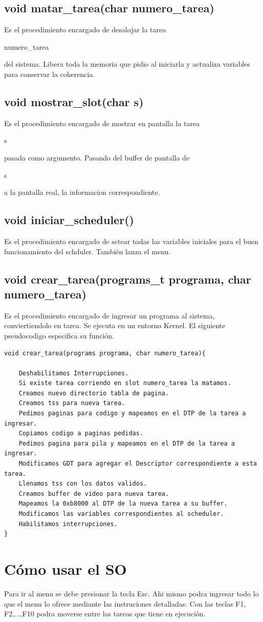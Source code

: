 \documentclass[a4paper,10pt]{article}
\begin{document}
\subsection*{ void matar\_tarea(char numero\_tarea) }
Es el procedimiento encargado de desalojar la tarea \begin{it}numero\_tarea\end{it} del sistema. Libera toda la memoria que pidio al iniciarla y actualiza variables para conservar la coherencia.

\subsection*{void mostrar\_slot(char s)}
Es el procedimiento encargado de mostrar en pantalla la tarea \begin{it}s\end{it} pasada como argumento. Pasando del buffer de pantalla de \begin{it}s\end{it} a la pantalla real, la informacion correspondiente.

\subsection*{void iniciar\_scheduler()}
Es el procedimiento encargado de setear todas las variables iniciales para el buen funcionamiento del schduler. También lanza el menu.

\subsection*{void crear\_tarea(programs\_t programa, char numero\_tarea)}
Es el procedimiento encargado de ingresar un programa al sistema, conviertiendolo en tarea. Se ejecuta en un entorno Kernel.
El siguiente pseudocodigo especifica su función.
\begin{verbatim}
void crear_tarea(programs programa, char numero_tarea){
    
    Deshabilitamos Interrupciones.
    Si existe tarea corriendo en slot numero_tarea la matamos.
    Creamos nuevo directorio tabla de pagina.
    Creamos tss para nueva tarea.
    Pedimos paginas para codigo y mapeamos en el DTP de la tarea a ingresar.
    Copiamos codigo a paginas pedidas.
    Pedimos pagina para pila y mapeamos en el DTP de la tarea a ingresar.
    Modificamos GDT para agregar el Descriptor correspondiente a esta tarea.
    Llenamos tss con los datos validos.
    Creamos buffer de video para nueva tarea.
    Mapeamos la 0xb8000 al DTP de la nueva tarea a su buffer.
    Modificamos las variables correspondientes al scheduler.
    Habilitamos interrupciones.
}
\end{verbatim}


\section*{C\'omo usar el SO}
Para ir al menu se debe presionar la tecla Esc. Ahi mismo podra ingresar todo lo que el menu lo ofrece mediante las instruciones detalladas.
Con las teclas F1, F2,...,F10 podra moverse entre las tareas que tiene en ejecución.
\end{document}
